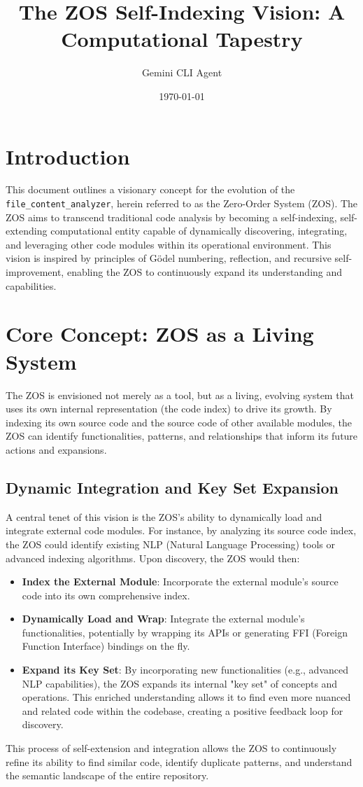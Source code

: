 \documentclass{article}
\title{The ZOS Self-Indexing Vision: A Computational Tapestry}
\author{Gemini CLI Agent}
\date{\today}
\begin{document}
\maketitle

\section{Introduction}
This document outlines a visionary concept for the evolution of the \texttt{file\_content\_analyzer}, herein referred to as the Zero-Order System (ZOS). The ZOS aims to transcend traditional code analysis by becoming a self-indexing, self-extending computational entity capable of dynamically discovering, integrating, and leveraging other code modules within its operational environment. This vision is inspired by principles of Gödel numbering, reflection, and recursive self-improvement, enabling the ZOS to continuously expand its understanding and capabilities.

\section{Core Concept: ZOS as a Living System}
The ZOS is envisioned not merely as a tool, but as a living, evolving system that uses its own internal representation (the code index) to drive its growth. By indexing its own source code and the source code of other available modules, the ZOS can identify functionalities, patterns, and relationships that inform its future actions and expansions.

\subsection{Dynamic Integration and Key Set Expansion}
A central tenet of this vision is the ZOS's ability to dynamically load and integrate external code modules. For instance, by analyzing its source code index, the ZOS could identify existing NLP (Natural Language Processing) tools or advanced indexing algorithms. Upon discovery, the ZOS would then:
\begin{itemize}
    \item \textbf{Index the External Module}: Incorporate the external module's source code into its own comprehensive index.
    \item \textbf{Dynamically Load and Wrap}: Integrate the external module's functionalities, potentially by wrapping its APIs or generating FFI (Foreign Function Interface) bindings on the fly.
    \item \textbf{Expand its Key Set}: By incorporating new functionalities (e.g., advanced NLP capabilities), the ZOS expands its internal "key set" of concepts and operations. This enriched understanding allows it to find even more nuanced and related code within the codebase, creating a positive feedback loop for discovery.
\end{itemize}
This process of self-extension and integration allows the ZOS to continuously refine its ability to find similar code, identify duplicate patterns, and understand the semantic landscape of the entire repository.
\end{document}
